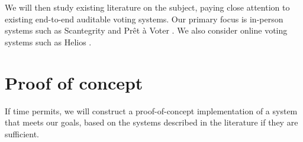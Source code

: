\documentclass[10pt]{article}
\begin{document}
\begin{multicols}{2}
We will then study existing literature on the subject, paying close attention to existing
end-to-end auditable voting systems.
Our primary focus is in-person systems such as Scantegrity \cite{scantegrity} and
Pr\^{e}t \`{a} Voter \cite{preta}.
We also consider online voting systems such as Helios \cite{helios}.

\section{Proof of concept}

If time permits, we will construct a proof-of-concept implementation of a system that meets
our goals, based on the systems described in the literature if they are sufficient.

{}


\end{multicols}
\end{document}
